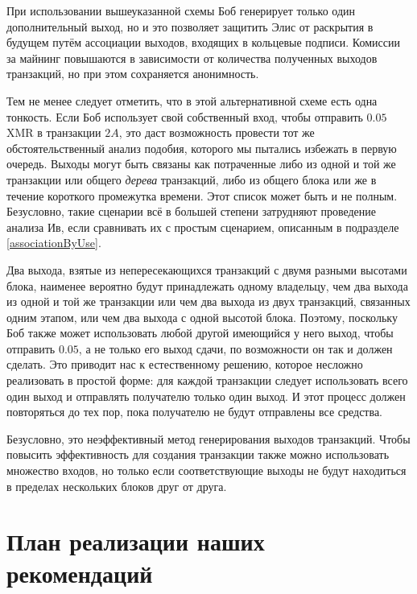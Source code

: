 \documentclass{mrl}
\begin{document}
При использовании вышеуказанной схемы Боб генерирует только один дополнительный выход, но и это позволяет защитить Элис от раскрытия в будущем путём ассоциации выходов, входящих в кольцевые подписи. Комиссии за майнинг повышаются в зависимости от количества полученных выходов транзакций, но при этом сохраняется анонимность.

Тем не менее следует отметить, что в этой альтернативной схеме есть одна тонкость. Если Боб использует свой собственный вход, чтобы отправить $0.05$ XMR в транзакции $2A$, это даст возможность провести тот же обстоятельственный анализ подобия, которого мы пытались избежать в первую очередь. Выходы могут быть связаны как потраченные либо из одной и той же транзакции или общего \textit{дерева} транзакций, либо из общего блока или же в течение короткого промежутка времени. Этот список может быть и не полным. Безусловно, такие сценарии всё в большей степени затрудняют проведение анализа Ив, если сравнивать их с простым сценарием, описанным в подразделе \ref{associationByUse}.

Два выхода, взятые из непересекающихся транзакций с двумя разными высотами блока, наименее вероятно будут принадлежать одному владельцу, чем два выхода из одной и той же транзакции или чем два выхода из двух транзакций, связанных одним этапом, или чем два выхода с одной высотой блока. Поэтому, поскольку Боб также может использовать любой другой имеющийся у него выход, чтобы отправить $0.05$, а не только его выход сдачи, по возможности он так и должен сделать. Это приводит нас к естественному решению, которое несложно реализовать в простой форме: для каждой транзакции следует использовать всего один выход и отправлять получателю только один выход. И этот процесс должен повторяться до тех пор, пока получателю не будут отправлены все средства.

Безусловно, это неэффективный метод генерирования выходов транзакций. Чтобы повысить эффективность для создания транзакции также можно использовать множество входов, но только если соответствующие выходы не будут находиться в пределах нескольких блоков друг от друга.


\section{План реализации наших рекомендаций}\label{softwareImplementation}
\end{document}
